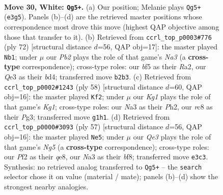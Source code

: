 \documentclass[11pt]{article}
\begin{document}
\clearpage

\begin{figure}[p]\centering
\begin{subfigure}{0.46\textwidth}\centering
\resizebox{\linewidth}{!}{%
\newchessgame
\chessboard[
  setfen={1rr5/7p/1p3k2/p4b2/7P/N3Q3/PP3PP1/R5K1 w - - 7 30},
  showmover=false,
  pgfstyle=straightmove, color=movearrow, markmove={e3-g5}
]}
\caption{}
\end{subfigure}\hfill
\begin{subfigure}{0.46\textwidth}\centering
\resizebox{\linewidth}{!}{%
\newchessgame
\chessboard[
  setfen={1rr3k1/7p/6p1/P3p3/3bp3/N6P/R4PP1/5R1K w - - 0 37},
  showmover=false,
  pgfstyle=straightmove, color=movearrow, markmove={a3-b1}
]}
\caption{}
\end{subfigure}
\\[4pt]
\begin{subfigure}{0.46\textwidth}\centering
\resizebox{\linewidth}{!}{%
\newchessgame
\chessboard[
  setfen={4r1k1/1b6/6pp/p2pr3/3N4/1PR1P1P1/7P/3R2K1 w - - 0 30},
  showmover=false,
  pgfstyle=straightmove, color=movearrow, markmove={g1-f2}
]}
\caption{}
\end{subfigure}\hfill
\begin{subfigure}{0.46\textwidth}\centering
\resizebox{\linewidth}{!}{%
\newchessgame
\chessboard[
  setfen={4QB2/kpq4p/p7/6p1/3r2n1/6P1/PP3P2/5RK1 b - - 0 29},
  showmover=false,
  pgfstyle=straightmove, color=movearrow, markmove={g4-e5}
]}
\caption{}
\end{subfigure}
\caption{\textbf{Move 30, White: \texttt{Qg5+}.} (a) Our position; Melanie plays \texttt{Qg5+} (\texttt{e3g5}). Panels (b)--(d) are the retrieved master positions whose correspondence most drove this move (highest QAP objective among those that transfer to it). (b) Retrieved from \texttt{ccrl\_top\_p0003\#776} (ply 72) [structural distance $d$=56, QAP obj=17]: the master played \texttt{Nb1}; under $\mu$ our \emph{Pb2} plays the role of that game's \emph{Na3} (a \textbf{cross-type} correspondence); cross-type roles: our \emph{b}f5 as their \emph{R}a2, our \emph{Q}e3 as their \emph{b}d4; transferred move \texttt{b2b3}. (c) Retrieved from \texttt{ccrl\_top\_p0002\#1243} (ply 58) [structural distance $d$=60, QAP obj=16]: the master played \texttt{Kf2}; under $\mu$ our \emph{Kg1} plays the role of that game's \emph{Kg1}; cross-type roles: our \emph{N}a3 as their \emph{P}h2, our \emph{r}c8 as their \emph{P}g3; transferred move \texttt{g1h1}. (d) Retrieved from \texttt{ccrl\_top\_p0000\#3093} (ply 57) [structural distance $d$=56, QAP obj=16]: the master played \texttt{Ne5}; under $\mu$ our \emph{Qe3} plays the role of that game's \emph{Ng5} (a \textbf{cross-type} correspondence); cross-type roles: our \emph{P}f2 as their \emph{q}e8, our \emph{N}a3 as their \emph{b}f8; transferred move \texttt{e3c3}. Synthesis: no retrieved analog transferred to \texttt{Qg5+} -- the \texttt{search} selector chose it on value (material / mate); panels (b)--(d) show the strongest nearby analogies.}
\label{fig:thought-m58}
\end{figure}
\end{document}
